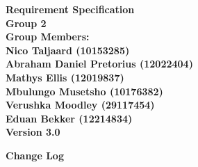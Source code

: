 \documentclass[12pt]{article}
\newcommand{\Title}{Requirement Specification} %
\begin{document}
	\vspace{4em}
	
	\begin{center}%
	
	  \LARGE \bf \Title \\[4em]
	  \LARGE {\bf Group 2}\\[1em]
	  \LARGE {\bf Group Members:}\\[2em]
	  \large
	     Nico Taljaard					(10153285) \\[1em]
	     Abraham Daniel Pretorius		(12022404) \\[1em]
	     Mathys Ellis					(12019837) \\[1em]
	     Mbulungo Musetsho				(10176382) \\[1em]
	     Verushka Moodley				(29117454) \\[1em]
	     Eduan Bekker					(12214834) \\[8em]
	     {\bf Version 3.0}
	    
	\end{center}%
	
	\newpage
		{\LARGE \bf Change Log}\\[2em]
		
\end{document}
